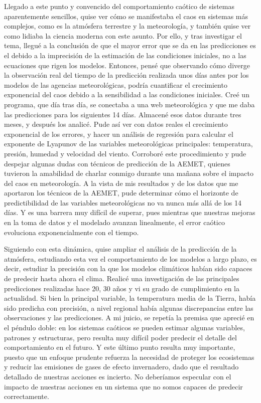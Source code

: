 \documentclass[
  10pt,
  a4paper,
  DIV=11,
  numbers=noendperiod,
  open=any]{scrreprt}
\numberwithin{equation}{chapter}
\numberwithin{equation}{section}
\renewcommand{\[}{\begin{equation}}
\renewcommand{\]}{\end{equation}}
\begin{document}
Llegado a este punto y convencido del comportamiento caótico de sistemas
aparentemente sencillos, quise ver cómo se manifestaba el caos en
sistemas más complejos, como es la atmósfera terrestre y la
meteorología, y también quise ver como lidiaba la ciencia moderna con
este asunto. Por ello, y tras investigar el tema, llegué a la conclusión
de que el mayor error que se da en las predicciones es el debido a la
imprecisión de la estimación de las condiciones iniciales, no a las
ecuaciones que rigen los modelos. Entonces, pensé que observando cómo
diverge la observación real del tiempo de la predicción realizada unos
días antes por los modelos de las agencias meteorológicas, podría
cuantificar el crecimiento exponencial del caos debido a la sensibilidad
a las condiciones iniciales. Creé un programa, que día tras día, se
conectaba a una web meteorológica y que me daba las predicciones para
los siguientes 14 días. Almacené esos datos durante tres meses, y
después los analicé. Pude así ver con datos reales el crecimiento
exponencial de los errores, y hacer un análisis de regresión para
calcular el exponente de Lyapunov de las variables meteorológicas
principales: temperatura, presión, humedad y velocidad del viento.
Corroboré este procedimiento y pude despejar algunas dudas con técnicos
de predicción de la AEMET, quienes tuvieron la amabilidad de charlar
conmigo durante una mañana sobre el impacto del caos en meteorología. A
la vista de mis resultados y de los datos que me aportaron los técnicos
de la AEMET, pude determinar cómo el horizonte de predictibilidad de las
variables meteorológicas no va nunca más allá de los 14 días. Y es una
barrera muy difícil de superar, pues mientras que nuestras mejoras en la
toma de datos y el modelado avanzan linealmente, el error caótico
evoluciona exponencialmente con el tiempo.

Siguiendo con esta dinámica, quise ampliar el análisis de la predicción
de la atmósfera, estudiando esta vez el comportamiento de los modelos a
largo plazo, es decir, estudiar la precisión con la que los modelos
climáticos habían sido capaces de predecir hasta ahora el clima. Realicé
una investigación de las principales predicciones realizadas hace 20, 30
años y vi su grado de cumplimiento en la actualidad. Si bien la
principal variable, la temperatura media de la Tierra, había sido
predicha con precisión, a nivel regional había algunas discrepancias
entre las observaciones y las predicciones. A mi juicio, se repetía la
premisa que aprecié en el péndulo doble: en los sistemas caóticos se
pueden estimar algunas variables, patrones y estructuras, pero resulta
muy difícil poder predecir el detalle del comportamiento en el futuro. Y
este último punto resulta muy importante, puesto que un enfoque prudente
refuerza la necesidad de proteger los ecosistemas y reducir las
emisiones de gases de efecto invernadero, dado que el resultado
detallado de nuestras acciones es incierto. No deberíamos especular con
el impacto de nuestras acciones en un sistema que no somos capaces de
predecir correctamente.
\end{document}
